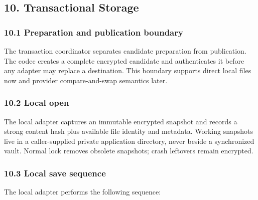 \documentclass[
  letterpaper,
]{article}
\begin{document}
\subsection{10. Transactional Storage}\label{10-transactional-storage}

\subsubsection{10.1 Preparation and publication boundary}\label{101-preparation-and-publication-boundary}

The transaction coordinator separates candidate preparation from publication. The codec creates a complete encrypted
candidate and authenticates it before any adapter may replace a destination. This boundary supports direct local files
now and provider compare-and-swap semantics later.

\subsubsection{10.2 Local open}\label{102-local-open}

The local adapter captures an immutable encrypted snapshot and records a strong content hash plus available file
identity and metadata. Working snapshots live in a caller-supplied private application directory, never beside a
synchronized vault. Normal lock removes obsolete snapshots; crash leftovers remain encrypted.

\subsubsection{10.3 Local save sequence}\label{103-local-save-sequence}

The local adapter performs the following sequence:
\end{document}
